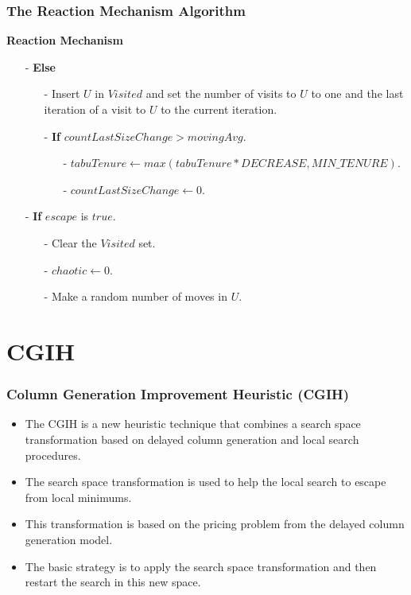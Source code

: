 \documentclass{beamer}
\begin{document}
\begin{frame}
  \frametitle{The Reaction Mechanism Algorithm}
{
{\bf Reaction Mechanism}

\begin{itemize}
\item[-] \textbf{Else}
    \begin{itemize}
    \item[-] Insert $U$ in $Visited$ and set the number of visits to $U$ to one and the last iteration of a visit to $U$ to the current iteration.
    \item[-] \textbf{If} $countLastSizeChange > movingAvg$.
        \begin{itemize}
        \item[-] $tabuTenure \leftarrow max(tabuTenure * DECREASE, MIN\_TENURE)$.
        \item[-] $countLastSizeChange \leftarrow 0$.
        \end{itemize}
    \end{itemize}
\item[-] \textbf{If} $escape$ is $true$.
    \begin{itemize}
    \item[-] Clear the $Visited$ set.
    \item[-] $chaotic \leftarrow 0$.
    \item[-] Make a random number of moves in $U$.
    \end{itemize}
\end{itemize}
}

\end{frame}


\section{CGIH}

\begin{frame}
  \frametitle{Column Generation Improvement Heuristic (CGIH)}
{
	
\begin{itemize}
	\item<1-> The CGIH is a new heuristic technique that combines a search space transformation based on delayed column generation and local search procedures.
	\item<2-> The search space transformation is used to help the local search to escape from local minimums.
	\item<3-> This transformation is based on the pricing problem from the delayed column generation model.
	\item<4-> The basic strategy is to apply the search space transformation and then restart the search in this new space.
	
\end{itemize}
}
\end{frame}
\end{document}
